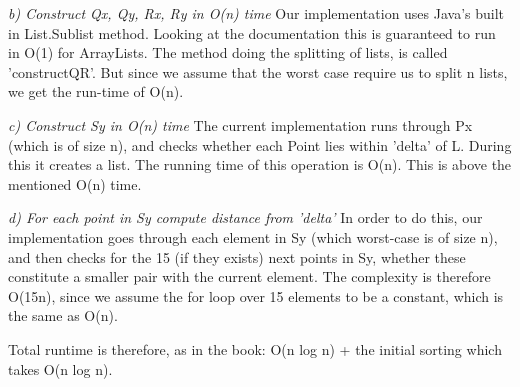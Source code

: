 \documentclass{tufte-handout}
\begin{document}
\emph{b) Construct Qx, Qy, Rx, Ry in O(n) time } \linebreak
Our implementation uses Java's built in List.Sublist method. Looking at the documentation this is guaranteed to run in O(1) for ArrayLists. 
The method doing the splitting of lists, is called 'constructQR'. But since we assume that the worst case require us to split n lists,
we get the run-time of O(n).

\bigskip
\emph{c) Construct Sy in O(n) time} \linebreak
The current implementation runs through Px (which is of size n), and checks whether each Point lies within 'delta' of L. During this it 
creates a list. The running time of this operation is O(n). 
This is above the mentioned O(n) time. 

\bigskip
\emph{d) For each point in Sy compute distance from 'delta'} \linebreak
In order to do this, our implementation goes through each element in Sy (which worst-case is of size n), 
and then checks for the 15 (if they exists) next points in Sy, whether these constitute a smaller pair with the current element. 
The complexity is therefore O(15n), since we assume the for loop over 15 elements to be a constant, which is the same as O(n).

\bigskip
Total runtime is therefore, as in the book: O(n log n) + the initial sorting which takes O(n log n).
\end{document}
